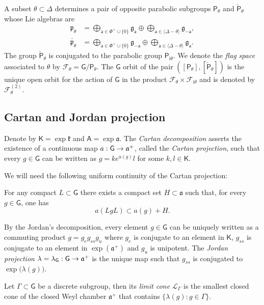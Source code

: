 \documentclass[AHL,Unicode,longabstracts,MathTools]{cedram}
\newcommand{\ii}{\mathrm{i}}
\newcommand{\cartan}{a}
\renewcommand{\sf}[1]{{\mathsf{#1}}}
\newcommand{\sroot}{{\sf{a}}}
\newcommand{\sfG}{\sf{G}}
\newcommand{\roots}{\mathsf{\Phi}}
\newcommand{\cal}{\mathcal}
\newcommand{\posgen}{\cal{F}^{(2)}}
\newcommand{\calF}{\mathcal{F}}
\renewcommand{\t}{\theta}
\newcommand{\simple}{{\sf \Delta}}
\renewcommand{\/}{\backslash}
\newcommand{\<}{\langle}
\renewcommand{\>}{\rangle}
\newcommand{\p}{\mathfrak{p}}
\renewcommand{\ge}{\mathfrak{g}}
\renewcommand{\a}{\mathfrak{a}}
\renewcommand{\k}{\mathfrak{k}}
\renewcommand*{\to}{\mathchoice{\longrightarrow}{\rightarrow}{\rightarrow}{\rightarrow}}
\begin{document}
A subset $\t\subset\simple$ determines a pair of opposite parabolic subgroups $\sf P_\t$ and $\check{\sf P}_\t$ whose Lie algebras are
\begin{align*}
\p_\t &=\bigoplus_{\sroot\in\roots^+\cup\{0\}}\ge_{\sroot} \oplus\bigoplus_{\sroot\in\<\simple-\t\>}\ge_{-\sroot},\\
\check{\p_\t}
&=\bigoplus_{\sroot\in\roots^+\cup\{0\}}\ge_{-\sroot} \oplus\bigoplus_{\sroot\in\<\simple-\t\>}\ge_{\sroot}.
\end{align*}
The group $\check{\sf P}_\t$ is conjugated to the parabolic group $\sf P_{\ii\t}$. We denote the \emph{flag space} associated to $\t$ by $\calF_\t=\sfG/\sf P_\t$. The $\sfG$ orbit of the pair $([\sf P_{\t}],[\check{\sf P}_{\t}])$ is the unique open orbit for the action of $\sfG$ in the product $\calF_\t\times\calF_{\ii\t}$ and is denoted by $\posgen_\t$.



\subsection{Cartan and Jordan projection}


Denote by $\sf K=\exp\k$ and $\sf A=\exp\a$. The \emph{Cartan decomposition} asserts the existence of a continuous map $\cartan:\sfG \to \a^+$, called the \emph{Cartan projection}, such that every $g\in\sfG$ can be written as $g=ke^{a(g)}l$ for some $k,l\in\sf K$.


We will need the following uniform continuity of the Cartan projection:


\begin{prop}\label{p.Ben}
For any compact $ L\subset \sfG$ there exists a compact set $H\subset \a$ such that, for every $g\in \sfG$, one has
\[
\cartan(LgL)\subset \cartan(g)+H.
\]
\end{prop}



By the Jordan's decomposition, every element $g\in\sfG$ can be uniquely written as a commuting product $g=g_eg_{ss}g_u$ where $g_e$ is conjugate to an element in $\sf K$, $g_{ss}$ is conjugate to an element in $\exp(\a^+)$ and $g_u$ is unipotent. The \emph{Jordan projection} $\lambda=\lambda_{\sfG}:\sfG\to\a^+$ is the unique map such that $g_{ss}$ is conjugated to $\exp\big(\lambda(g)\big)$.


\begin{defi}
Let $\Gamma\subset\sfG$ be a discrete subgroup, then its \emph{limit cone} $\cal L_\Gamma$ is the smallest closed cone of the closed Weyl chamber $\a^+$ that contains $\{\lambda(g):g\in\Gamma\}$.
\end{defi}
\end{document}
